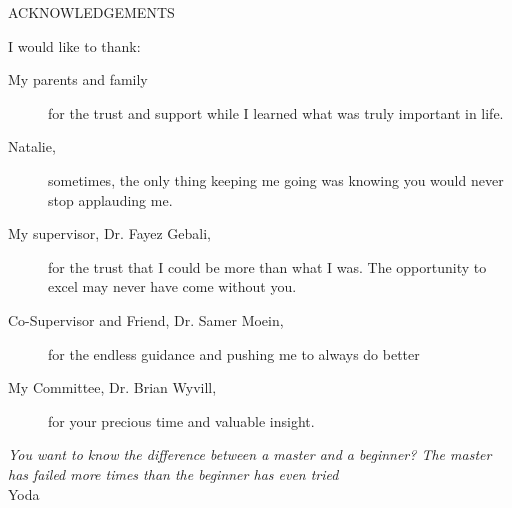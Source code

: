 \newpage
{}

\begin{center}
ACKNOWLEDGEMENTS
\end{center}

\noindent I would like to thank:
\begin{description}
\item[My parents and family]
	for the trust and support while I learned what was truly important in life.
\item[Natalie, ]
	sometimes, the only thing keeping me going was knowing you would never stop applauding me.
\item[My supervisor, Dr. Fayez Gebali, ]
	for the trust that I could be more than what I was. The opportunity to excel may never have come without you.
\item[Co-Supervisor and Friend, Dr. Samer Moein, ]
	for the endless guidance and pushing me to always do better
\item[My Committee, Dr. Brian Wyvill, ]
	for your precious time and valuable insight.
\end{description}

\begin{flushright}
\textit{You want to know the difference between a master and a beginner? The master has failed more times than the beginner has even tried}
\\
Yoda \\
\end{flushright}
